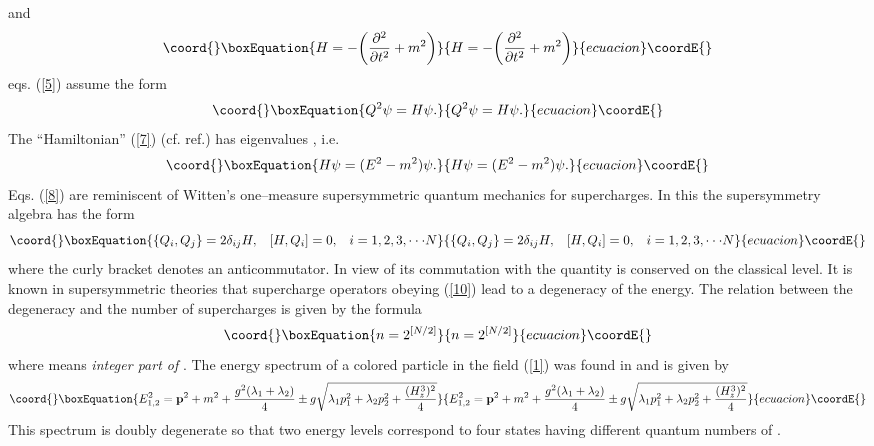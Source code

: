 \documentclass[a4paper,12pt,a4]{article}
\begin{document}
and
\begin{equation}\coord{}\boxEquation{
H=-\bigg(\frac{\partial^2}{\partial t^2} + m^2\bigg)
\label{7}
}{
H=-\bigg(\frac{\partial^2}{\partial t^2} + m^2\bigg)
}{ecuacion}\coordE{}\end{equation}
eqs. (\ref{5}) assume the form
\begin{equation}\coord{}\boxEquation{
Q^2\psi = H\psi.
\label{8}
}{
Q^2\psi = H\psi.
}{ecuacion}\coordE{}\end{equation}
The ``Hamiltonian'' (\ref{7}) (cf. ref.\cite{2})
 has eigenvalues \coordHE{}, i.e.
\begin{equation}\coord{}\boxEquation{
H\psi = (E^2-m^2)\psi.
\label{9}
}{
H\psi = (E^2-m^2)\psi.
}{ecuacion}\coordE{}\end{equation}
Eqs. (\ref{8}) are reminiscent of Witten's one--measure
supersymmetric quantum mechanics \cite{1}
for \coordHE{} supercharges. In
this the supersymmetry algebra
has the form
\begin{equation}\coord{}\boxEquation{
\{Q_i, Q_j\}= 2\delta_{ij}H, \;\;\;
 [H, Q_i]=0, \;\;\; i=1, 2, 3, \cdot\cdot\cdot N
\label{10}
}{
\{Q_i, Q_j\}= 2\delta_{ij}H, \;\;\;
 [H, Q_i]=0, \;\;\; i=1, 2, 3, \cdot\cdot\cdot N
}{ecuacion}\coordE{}\end{equation}
where the curly bracket denotes an anticommutator.
In view of its commutation
with \coordHE{} the quantity \coordHE{} is conserved on
the classical level.
It is known in supersymmetric theories that supercharge operators
\coordHE{} obeying (\ref{10}) lead to a degeneracy of the energy.
The relation between the
degeneracy \coordHE{} and the number of supercharges \coordHE{}
is given by the formula
\begin{equation}\coord{}\boxEquation{
n=2^{[N/2]} 
\label{11}
}{
n=2^{[N/2]} 
}{ecuacion}\coordE{}\end{equation}
where \myHighlight{$[N/2]$}\coordHE{} means {\it integer part of} \coordHE{}.  
The energy spectrum of a colored particle in the field
(\ref{1}) was  found in \cite{10} and is given by
\begin{equation}\coord{}\boxEquation{
E^2_{1,2}={\bf p}^2 + m^2 +\frac{g^2(\lambda_1+\lambda_2)}{4} 
\pm g\sqrt{\lambda_1 p^2_1+\lambda_2p^2_2+\frac{(H^3_z)^2}{4}}
\label{12}
}{
E^2_{1,2}={\bf p}^2 + m^2 +\frac{g^2(\lambda_1+\lambda_2)}{4} 
\pm g\sqrt{\lambda_1 p^2_1+\lambda_2p^2_2+\frac{(H^3_z)^2}{4}}
}{ecuacion}\coordE{}\end{equation}
This spectrum is doubly degenerate so that two
energy levels correspond to four states
having different quantum numbers of \myHighlight{$(\sigma, \tau)$}\coordHE{}.
\end{document}
